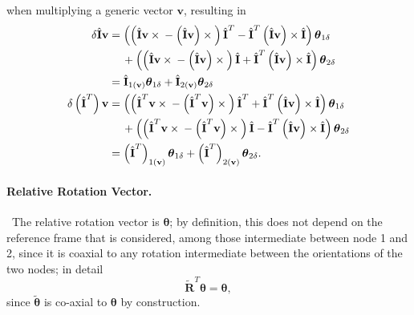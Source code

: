 \documentclass[10pt,dvips,fleqn,subeqn]{report}
\newcommand{\T}[1]{\bm{\mathbf{#1}}}
\newcommand{\TT}[1]{\bm{\mathbf{#1}}}
\begin{document}
when multiplying a generic vector $\T{v}$, resulting in
\begin{subequations}
\begin{align}
	\delta\hat{\T{I}} \T{v}
	&= \plbr{
		\plbr{
			\hat{\T{I}} \T{v} \times{}
			- \plbr{\hat{\T{I}} \T{v}} \times{}
		} \hat{\T{I}}^T
		- \hat{\T{I}}^T \plbr{\hat{\T{I}} \T{v}} \times \hat{\T{I}}
	} \T{\theta}_{1\delta}
		\nonumber \\
	& \mbox{\hspace{12pt}} + \plbr{
		\plbr{
			\hat{\T{I}} \T{v} \times{}
			- \plbr{\hat{\T{I}} \T{v}} \times{}
		} \hat{\T{I}}
		+ \hat{\T{I}}^T \plbr{\hat{\T{I}} \T{v}} \times \hat{\T{I}}
	} \T{\theta}_{2\delta}
		\nonumber \\
	&= \hat{\TT{I}}_{1\plbr{\T{v}}} \T{\theta}_{1\delta}
		+ \hat{\TT{I}}_{2\plbr{\T{v}}} \T{\theta}_{2\delta} \\
	\delta\plbr{\hat{\T{I}}^T} \T{v}
	&= \plbr{
		\plbr{
			\hat{\T{I}}^T \T{v} \times{}
			- \plbr{\hat{\T{I}}^T \T{v}} \times{}
		} \hat{\T{I}}^T
		+ \hat{\T{I}}^T \plbr{\hat{\T{I}} \T{v}} \times \hat{\T{I}}
	} \T{\theta}_{1\delta}
		\nonumber \\
	& \mbox{\hspace{12pt}} + \plbr{
		\plbr{
			\hat{\T{I}}^T \T{v} \times{}
			- \plbr{\hat{\T{I}}^T \T{v}} \times{}
		} \hat{\T{I}}
		- \hat{\T{I}}^T \plbr{\hat{\T{I}} \T{v}} \times \hat{\T{I}}
	} \T{\theta}_{2\delta}
		\nonumber \\
	&= \plbr{\hat{\TT{I}}^T}_{1\plbr{\T{v}}} \T{\theta}_{1\delta}
		+ \plbr{\hat{\TT{I}}^T}_{2\plbr{\T{v}}} \T{\theta}_{2\delta} .
\end{align}
\end{subequations}


\paragraph{Relative Rotation Vector.} \
The relative rotation vector is $\T{\theta}$; by definition, this does not depend
on the reference frame that is considered, among those intermediate 
between node 1 and 2, since it is coaxial to any rotation intermediate 
between the orientations of the two nodes; in detail
\begin{equation}
	\tilde{\T{R}}^T \T{\theta} = \T{\theta} ,
\end{equation}
since $\tilde{\T{\theta}}$ is co-axial to $\T{\theta}$
by construction.
\end{document}
